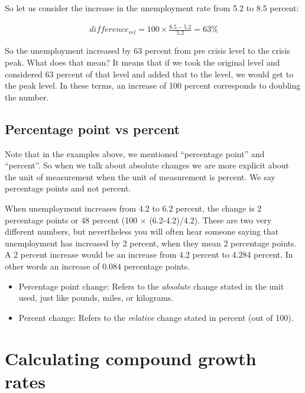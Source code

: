 \documentclass[
]{book}
\begin{document}
So let us consider the increase in the unemployment rate from 5.2 to 8.5 percent:

\begin{align}
    difference_{rel}=100\times \frac{8.5-5.2}{5.2}=63\%\nonumber
\end{align}

So the unemployment increased by 63 percent from pre crisis level to the crisis peak. What does that mean? It means that if we took the original level and considered 63 percent of that level and added that to the level, we would get to the peak level. In these terms, an increase of 100 percent corresponds to doubling the number.

\hypertarget{percentage-point-vs-percent}{%
\subsection*{Percentage point vs percent}\label{percentage-point-vs-percent}}

Note that in the examples above, we mentioned ``percentage point'' and ``percent''. So when we talk about absolute changes we are more explicit about the unit of measurement when the unit of measurement is percent. We say percentage points and not percent.

When unemployment increases from 4.2 to 6.2 percent, the change is 2 percentage points or 48 percent (100 \(\times\) (6.2-4.2)/4.2). These are two very different numbers, but nevertheless you will often hear someone saying that unemployment has increased by 2 percent, when they mean 2 percentage points. A 2 percent increase would be an increase from 4.2 percent to 4.284 percent. In other words an increase of 0.084 percentage points.

\begin{itemize}
\item
  Percentage point change: Refers to the \emph{absolute} change stated in the unit used, just like pounds, miles, or kilograms.
\item
  Percent change: Refers to the \emph{relative} change stated in percent (out of 100).
\end{itemize}

\hypertarget{calculating-compound-growth-rates}{%
\section{Calculating compound growth rates}\label{calculating-compound-growth-rates}}
\end{document}
